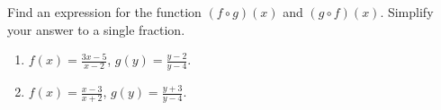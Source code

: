Find an expression for the function $(f\circ g)(x)$ and $(g\circ f)(x)$. Simplify your answer to a single fraction. 
\begin{enumerate}
\item $ f(x)= \frac{3x-5}{x-2}$, $g(y)=\frac{y-2 }{y-4} $. 
\item $ f(x)= \frac{x-3}{x+2}$, $g(y)=\frac{y+3 }{y-4} $. 
\end{enumerate}
